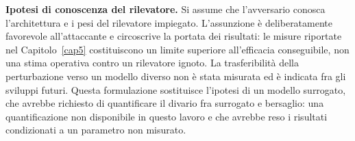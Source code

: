 
\textbf{Ipotesi di conoscenza del rilevatore.}
Si assume che l'avversario conosca l'architettura e i pesi del rilevatore
impiegato. L'assunzione è deliberatamente favorevole all'attaccante e
circoscrive la portata dei risultati: le misure riportate nel
Capitolo~\ref{cap5} costituiscono un limite superiore all'efficacia
conseguibile, non una stima operativa contro un rilevatore ignoto. La
trasferibilità della perturbazione verso un modello diverso non è stata
misurata ed è indicata fra gli sviluppi futuri. Questa formulazione sostituisce
l'ipotesi di un modello surrogato, che avrebbe richiesto di quantificare il
divario fra surrogato e bersaglio: una quantificazione non disponibile in
questo lavoro e che avrebbe reso i risultati condizionati a un parametro non
misurato.

